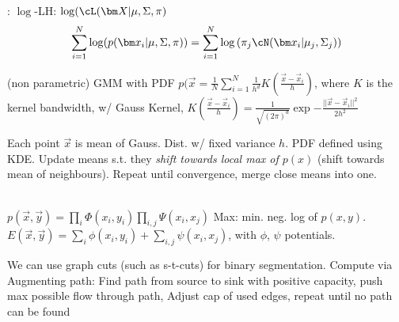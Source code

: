 
: $\log$-LH: $\log(\cL(\mat{X} | \mu, \Sigma, \pi)$
\rmvspace
\[
    \sum_{i = 1}^{N} \log(p(\vec{x}_i | \mu, \Sigma, \pi))
    = \sum_{i = 1}^{N} \log\left( \pi_j \cN(\vec{x}_i | \mu_j, \Sigma_j)\right)
\]
\rmvspace

 (non parametric) GMM with PDF $p(\vec{x} = \frac{1}{N} \sum_{i = 1}^{N} \frac{1}{h^d} K\left( \frac{\vec{x} - \vec{x}_i}{h} \right)$,
where $K$ is the kernel bandwidth, w/ Gauss Kernel, $K\left( \frac{\vec{x} - \vec{x}_i}{h} \right) = \frac{1}{\sqrt{(2\pi)^d}} \exp{-\frac{||\vec{x} - \vec{x}_i||^2}{2h^2}}$

 Each point $\vec{x}$ is mean of Gauss. Dist. w/ fixed variance $h$. PDF defined using KDE.
Update means s.t. they \textit{shift towards local max of $p(x)$} (shift towards mean of neighbours). Repeat until convergence, merge close means into one.

\\
 $p(\vec{x}, \vec{y}) = \prod_i \Phi(x_i, y_i) \prod_{i, j} \Psi(x_i, x_j)$ %
Max: min. neg. log of $p(x, y)$.  $E(\vec{x}, \vec{y}) = \sum_{i} \phi(x_i, y_i) + \sum_{i, j} \psi(x_i, x_j)$, with $\phi$, $\psi$ potentials.

We can use graph cuts (such as s-t-cuts) for binary segmentation.
Compute via Augmenting path:  Find path from source to sink with positive capacity,  push max possible flow through path,  Adjust cap of used edges,
 repeat until no path can be found
